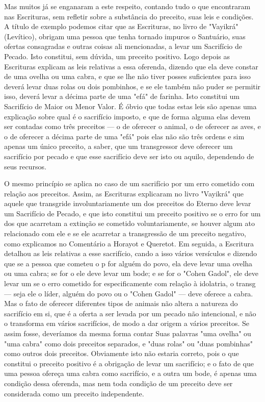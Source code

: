\begin{itemize}
\begin{enumrate}
Mas muitos já se enganaram a este respeito, contando tudo o que
encontraram nas Escrituras, sem refletir sobre a substância do preceito,
suas leis e condições. A título de exemplo podemos citar que as
Escrituras, no livro de "Vayikrá" (Levítico), obrigam uma pessoa que
tenha tornado impuros o San­tuário, suas ofertas consagradas e outras
coisas ali mencionadas, a levar um Sa­crifício de Pecado. Isto
constitui, sem dúvida, um preceito positivo. Logo de­pois as Escrituras
explicam as leis relativas a essa oferenda, dizendo que ela de­ve
constar de uma ovelha ou uma cabra, e que se lhe não tiver posses
suficien­tes para isso deverá levar duas rolas ou dois pombinhos, e se
ele também não puder se permitir isso, deverá levar a décima parte de
uma "efá" de farinha. Isto constitui um Sacrifício de Maior ou Menor
Valor. É óbvio que todas estas leis são apenas uma explicação sobre qual
é o sacrifício imposto, e que de for­ma alguma elas devem ser contadas
como três preceitos --- o de oferecer o ani­mal, o de oferecer as aves,
e o de oferecer a décima parte de uma "efá" pois elas não são três
ordens e sim apenas um único preceito, a saber, que um transgressor deve
oferecer um sacrifício por pecado e que esse sacrifício deve ser isto ou
aquilo, dependendo de seus recursos.

O mesmo princípio se aplica no caso de um sacrifício por um erro
cometido com relação aos preceitos. Assim, as Escrituras explicaram no
livro "Vayikrá" que aquele que transgride involuntariamente um dos
preceitos do Eterno deve levar um Sacrifício de Pecado, e que isto
constitui um preceito positivo se o erro for um dos que acarretam a
extinção se cometido voluntaria­mente, se houver algum ato relacionado
com ele e se ele acarretar a transgres­são de um preceito negativo, como
explicamos no Comentário a Horayot e Que­retot. Em seguida, a Escritura
detalhou as leis relativas a esse sacrifício, cando a isso vários
versículos e dizendo que se a pessoa que cometeu o p for alguém do povo,
ela deve levar uma ovelha ou uma cabra; se for o ele deve levar um bode;
e se for o "Cohen Gadol", ele deve levar um se o erro cometido for
especificamente com relação à idolatria, o transg --- seja ele o líder,
alguém do povo ou o "Cohen Gadol" --- deve oferece a cabra. Mas o fato
de oferecer diferentes tipos de animais não altera a natureza do
sacrifício em si, que é a oferta a ser levada por um pecado não
intencional, e não o transforma em vários sacrifícios, de modo a dar
origem a vários precei­tos. Se assim fosse, deveríamos da mesma forma
contar Suas palavras "uma ove­lha" ou "uma cabra" como dois preceitos
separados, e "duas rolas" ou "duas pombinhas" como outros dois
preceitos. Obviamente isto não estaria correto, pois o que constitui o
preceito positivo é a obrigação de levar um sacrifício; e o fato de que
uma pessoa ofereça uma cabra como sacrifício, e a outra um bode, é
apenas uma condição dessa oferenda, mas nem toda condição de um preceito
deve ser considerada como um preceito independente.


\end{enumrate}
\end{itemize}
